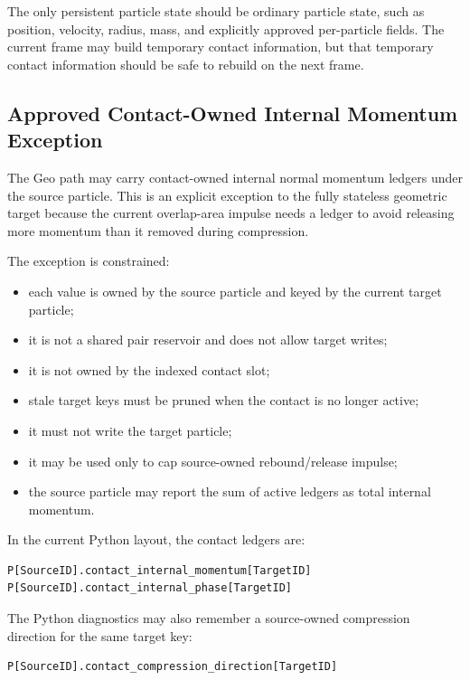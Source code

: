 The only persistent particle state should be ordinary particle state, such as
position, velocity, radius, mass, and explicitly approved per-particle fields.
The current frame may build temporary contact information, but that temporary
contact information should be safe to rebuild on the next frame.

\subsection{Approved Contact-Owned Internal Momentum Exception}

The Geo path may carry contact-owned internal normal momentum ledgers under
the source particle.  This is an explicit exception to the fully stateless
geometric target because the current overlap-area impulse needs a ledger to
avoid releasing more momentum than it removed during compression.

The exception is constrained:

\begin{itemize}[leftmargin=*]
    \item each value is owned by the source particle and keyed by the current
    target particle;
    \item it is not a shared pair reservoir and does not allow target writes;
    \item it is not owned by the indexed contact slot;
    \item stale target keys must be pruned when the contact is no longer active;
    \item it must not write the target particle;
    \item it may be used only to cap source-owned rebound/release impulse;
    \item the source particle may report the sum of active ledgers as total
    internal momentum.
\end{itemize}

In the current Python layout, the contact ledgers are:

\begin{verbatim}
P[SourceID].contact_internal_momentum[TargetID]
P[SourceID].contact_internal_phase[TargetID]
\end{verbatim}

The Python diagnostics may also remember a source-owned compression direction
for the same target key:

\begin{verbatim}
P[SourceID].contact_compression_direction[TargetID]
\end{verbatim}

